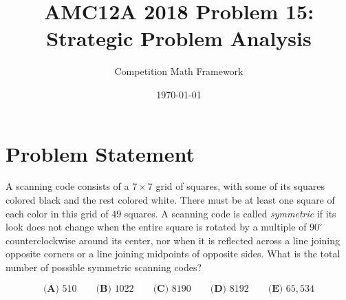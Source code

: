 \documentclass[]{article}
\begin{document}
\title{AMC12A 2018 Problem 15: Strategic Problem Analysis}
\author{Competition Math Framework}
\date{\today}
\maketitle

\section*{Problem Statement}

A scanning code consists of a $7 \times 7$ grid of squares, with some of its squares colored black and the rest colored white. There must be at least one square of each color in this grid of $49$ squares. A scanning code is called \textit{symmetric} if its look does not change when the entire square is rotated by a multiple of $90^{\circ}$ counterclockwise around its center, nor when it is reflected across a line joining opposite corners or a line joining midpoints of opposite sides. What is the total number of possible symmetric scanning codes?

$$\textbf{(A) } 510 \qquad \textbf{(B) } 1022 \qquad \textbf{(C) } 8190 \qquad \textbf{(D) } 8192 \qquad \textbf{(E) } 65,534$$
\end{document}
